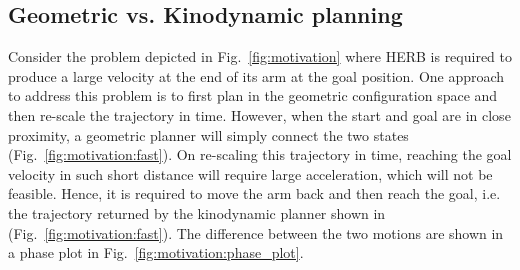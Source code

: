 \documentclass[letterpaper, 10 pt, conference]{ieeeconf}  %
\begin{document}
\subsection{Geometric vs. Kinodynamic planning}
Consider the problem depicted in Fig.~\ref{fig:motivation} where HERB is required to produce a large velocity at the end of its arm at the goal position.
One approach to address this problem is to first plan in the geometric configuration space and then re-scale the trajectory in time.
However, when the start and goal are in close proximity, a geometric planner will simply connect the two states (Fig.~\ref{fig:motivation:fast}).
On re-scaling this trajectory in time, reaching the goal velocity in such short distance will require large acceleration, which will not be feasible.
Hence, it is required to move the arm back and then reach the goal, i.e. the trajectory returned by the kinodynamic planner shown in (Fig.~\ref{fig:motivation:fast}).
The difference between the two motions are shown in a phase plot in Fig.~\ref{fig:motivation:phase_plot}.

\end{document}
